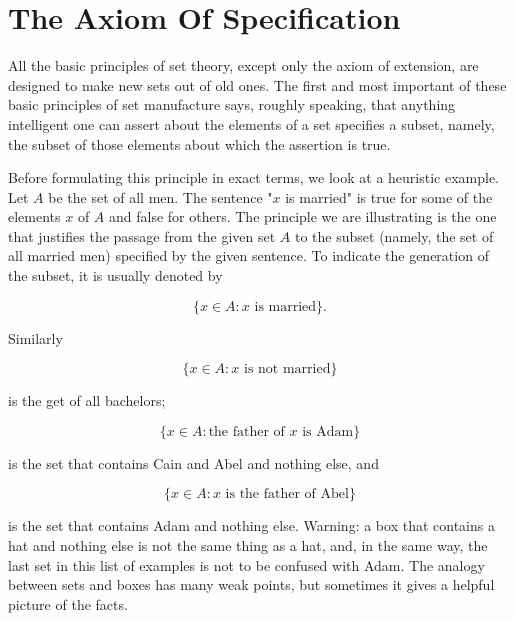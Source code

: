 

\chapter{The Axiom Of Specification} 


All the basic principles of set theory, except only the axiom of extension, are designed to make new sets out of old ones. The first and most important of these basic principles of set manufacture says, roughly speaking, that anything intelligent one can assert about the elements of a set specifies a subset, namely, the subset of those elements about which the assertion is true.

Before formulating this principle in exact terms, we look at a heuristic example. Let $A$ be the set of all men. The sentence "$x$ is married" is true for some of the elements $x$ of $A$ and false for others. The principle we are illustrating is the one that justifies the passage from the given set $A$ to the subset (namely, the set of all married men) specified by the given sentence. To indicate the generation of the subset, it is usually denoted by 

\begin{equation*}
\{ x \in A: x\text{ is married} \}.
\end{equation*}

Similarly 

\begin{equation*}
\{ x \in A: x\text{ is not married} \}
\end{equation*}

is the get of all bachelors; 

\begin{equation*}
\{ x \in A: \text{the father of } x \text{ is Adam} \} 
\end{equation*}

is the set that contains Cain and Abel and nothing else, and

\begin{equation*}
\{ x \in A: x \text{ is the father of Abel} \}  
\end{equation*}

is the set that contains Adam and nothing else. Warning: a box that contains a hat and nothing else is not the same thing as a hat, and, in the same way, the last set in this list of examples is not to be confused with Adam. The analogy between sets and boxes has many weak points, but sometimes it gives a helpful picture of the facts. 

